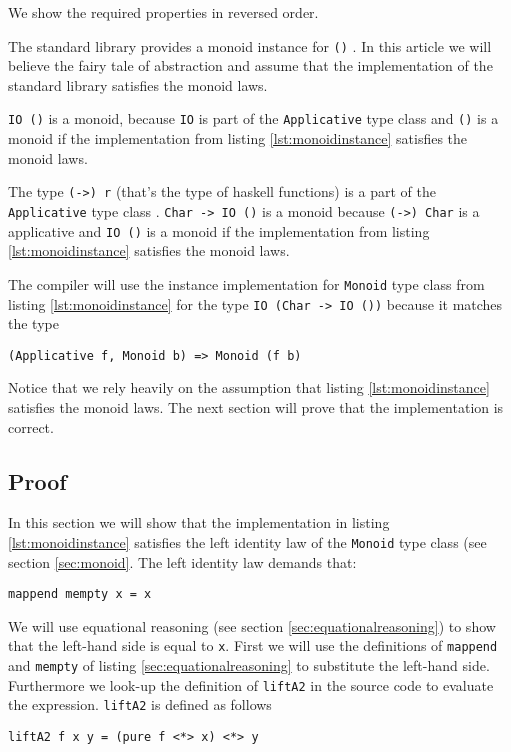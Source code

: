We show the required properties in reversed order.

\begin{etaremune}
\item The standard library provides a monoid instance for \verb|()| \cite{monoid}. In this article we will believe the fairy tale of abstraction and assume that the implementation of the standard library satisfies the monoid laws.
\item \verb|IO ()| is a monoid, because \verb|IO| is part of the \verb|Applicative| type class \cite{control.applicative} and \verb|()| is a monoid if the implementation from listing \ref{lst:monoidinstance} satisfies the monoid laws.
\item The type \verb|(->) r| (that's the type of haskell functions) is a part of the \verb|Applicative| type class \cite{control.applicative}.
 \verb|Char -> IO ()| is a monoid because \verb|(->) Char| is a applicative and \verb|IO ()| is a monoid if the implementation from listing \ref{lst:monoidinstance} satisfies the monoid laws.
\item The compiler will use the instance implementation for \verb|Monoid| type class from listing \ref{lst:monoidinstance} for the type \verb|IO (Char -> IO ())| because it matches the type
\begin{verbatim}
(Applicative f, Monoid b) => Monoid (f b)
\end{verbatim}

\end{etaremune} 

Notice that we rely heavily on the assumption that listing \ref{lst:monoidinstance} satisfies the monoid laws. The next section will prove that the implementation is correct.

\subsection{Proof}
\label{sec:exampleproof}

In this section we will show that the implementation in listing \ref{lst:monoidinstance} satisfies the left identity law of the \verb|Monoid| type class (see section \ref{sec:monoid}.
The left identity law demands that:
\begin{verbatim}
mappend mempty x = x
\end{verbatim}

We will use equational reasoning (see section \ref{sec:equationalreasoning}) to show that the left-hand side is equal to \verb|x|. First we will use the definitions of \verb|mappend| and \verb|mempty| of listing \ref{sec:equationalreasoning} to substitute the left-hand side. Furthermore we look-up the definition of \verb|liftA2| in the source code \cite{control.applicative} to evaluate the expression. 
\verb|liftA2| is defined as follows
\begin{verbatim}
liftA2 f x y = (pure f <*> x) <*> y
\end{verbatim}

